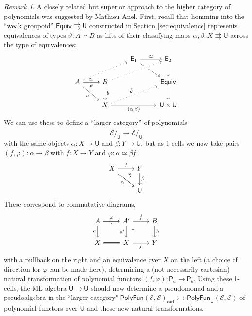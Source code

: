\documentclass[12pt,reqno]{amsart}
\newcommand{\EE}{\ensuremath{\mathcal{E}}}
\newcommand{\alg}[1]{\ensuremath{\mathsf{#1}}}
\newcommand{\mono}{\ensuremath{\rightarrowtail}}
\renewcommand{\to}{\ensuremath{\rightarrow}}
\newcommand{\tto}{\ensuremath{\rightrightarrows}}
\newcommand{\T}{\ensuremath{\mathsf{U}}}
\newcommand{\TT}{\ensuremath{\dot{\mathsf{U}}}}
\newcommand{\pbcorner}{\arrow[dr,phantom,"\lrcorner" very near start, shift right=.5ex]} %
\theoremstyle{remark}
\newtheorem{remark}[theorem]{Remark}
\theoremstyle{definition}
\begin{document}
\begin{remark}\label{remark:Anel}
A closely related but superior approach to the higher category of polynomials was suggested by Mathieu Anel. First, recall that homming into the ``weak groupoid'' $\mathsf{Equiv} \tto \T$ constructed in Section \ref{sec:equivalence} represents equivalences of types $\vartheta : A \simeq B$ as lifts of their classifying maps $\alpha, \beta : X \tto \T$ across the type of equivalences:
\begin{equation}\label{diag:equivdef2}
\begin{tikzcd} 
	&& \mathsf{E}_1 \ar[rd]  \ar[r,"{\simeq}"]  & \mathsf{E}_2 \ar[d] \\  
A \ar[rd,swap, "a"] \ar[r,swap, "{\vartheta}"]  \ar[r, "{\simeq}"]  \ar[rru, dotted] & B \ar[d, "b"] \ar[rru, crossing over, dotted] && \mathsf{Equiv} \ar[d] \\  
& X \ar[rru, dotted, "{\tilde{\vartheta}}"] \ar[rr, swap, "{(\alpha, \beta)}"] && \T \times \T
	 \end{tikzcd}
 \end{equation}
We can use these to define a ``larger category'' of polynomials $$\EE/_\T \to \EE\widetilde{/}_\T$$ with the same objects $\alpha: X \to \T$ and $\beta : Y\to \T$, but as 1-cells we now take pairs $(f, \varphi) : \alpha \to \beta$ with $f : X \to Y$ and $\varphi : \alpha \simeq \beta f$.
\begin{equation}\label{diag:new1cells}
\begin{tikzcd}
X \ar[r,swap,swap, "{f}"] \ar[rd,swap, "\alpha"] \ar[dr, "{\stackrel{\varphi}{\simeq}}"]&  Y \ar[d, "\beta"] \\
& \T
\end{tikzcd}
\end{equation}
These correspond to commutative diagrams,
\begin{equation}\label{diag:new1cells2}
\begin{tikzcd}
 A \ar[r, "{\varphi}"] \ar[r,swap, "{\sim}"] \ar[d,swap, "a"] & A' \ar[d, swap, "a'"]  \ar[r, "{\dot{f}}"]   \pbcorner & B \ar[d, "b"] \\  
 X \ar[r, equals] & X \ar[r,swap, "{f}"] &  Y
 \end{tikzcd}
 \end{equation}
 with a pullback on the right and an equivalence over $X$ on the left (a choice of direction for $\varphi$ can be made here),
determining a (not necessarily cartesian) natural transformation of polynomial functors $(f, \varphi) : \alg{P}_a \to \alg{P}_b$.  Using these 1-cells, the ML-algebra $\TT\to\T$ should now determine a pseudomonad and a pseudoalgebra in the ``larger category" $\mathsf{PolyFun}(\EE, \EE)_\mathsf{cart} \mono \mathsf{PolyFun}_\T(\EE, \EE)$ of polynomial functors over $\T$ and these new natural transformations.


\end{remark}
\end{document}

